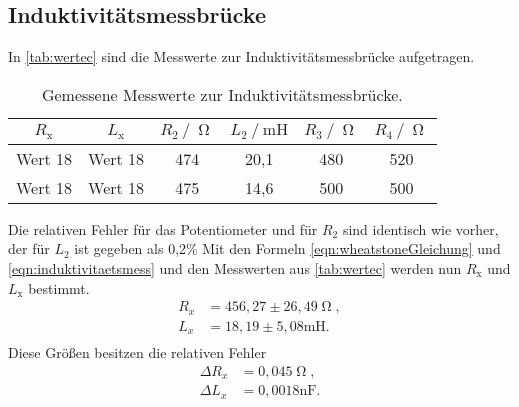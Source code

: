 \subsection{Induktivitätsmessbrücke}
In \autoref{tab:wertec} sind die Messwerte zur Induktivitätsmessbrücke aufgetragen.
\begin{table}[H]
  \centering
  \caption{Gemessene Messwerte zur Induktivitätsmessbrücke.}
  \label{tab:wertec}
  \begin{tabular}{c c c c c c}
    \toprule
    $R_{\text{x}}$ & $L_{\text{x}}$ & $R_{\text{2}} \:/\: \upOmega$ & $L_{\text{2}} \:/\: \si{\milli\henry}$ & $R_{\text{3}} \:/\: \upOmega$ & $R_{\text{4}} \:/\: \upOmega$ \\
    \midrule
    Wert 18 & Wert 18 & 474 & 20,1 & 480 & 520 \\
    Wert 18 & Wert 18 & 475 & 14,6 & 500 & 500 \\
    \bottomrule
  \end{tabular}
\end{table}
Die relativen Fehler für das Potentiometer und für $R_2$ sind identisch wie vorher, der für $L_2$ ist gegeben als 0,2\%
Mit den Formeln \autoref{eqn:wheatstoneGleichung} und \autoref{eqn:induktivitaetsmess} und den Messwerten aus \autoref{tab:wertec} werden nun $R_{\text{x}}$
und $L_{\text{x}}$ bestimmt.
\begin{align*}
  R_x &= 456,27 \pm 26,49 \upOmega, \\
  L_x &= 18,19 \pm 5,08 \si{\milli\henry} . \\
\end{align*}
Diese Größen besitzen die relativen Fehler
\begin{align*}
  \Delta R_x &= 0,045 \upOmega, \\
  \Delta L_x &= 0,0018 \si{\nano\farad} . \\
\end{align*}


